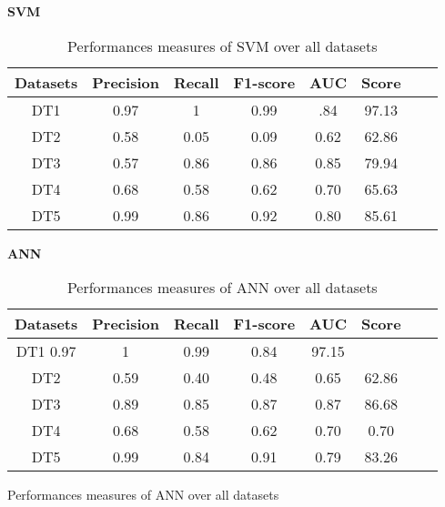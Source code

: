 \documentclass[10pt,a4paper]{article}
\begin{document}
\begin{center}
\textbf{SVM}

\end{center}
\begin{table}[!ht]
\centering
\begin{tabular}{*{6}{c}l r}
  \toprule
  \textbf{Datasets} & \textbf{Precision} & \textbf{Recall} & \textbf{F1-score}&\textbf{AUC} &\textbf{Score}\\
   \midrule
  DT1 &0.97 &1   &0.99 &.84 &97.13 \\
  DT2 &0.58  &0.05   & 0.09&0.62&62.86\\
  DT3 &0.57 & 0.86&0.86&0.85&79.94\\
  DT4 & 0.68&0.58&0.62&0.70&65.63\\
  DT5 &0.99 &0.86&0.92&0.80&85.61\\
    \bottomrule
\end{tabular}
\caption{Performances measures of SVM over all datasets}\label{perf-measure-dt1}
\end{table}
\begin{center}
\textbf{ANN}
\end{center}
\begin{table}[!ht]
\centering
\begin{tabular}{*{6}{c}l r}
  \toprule
  \textbf{Datasets} & \textbf{Precision} & \textbf{Recall} & \textbf{F1-score}&\textbf{AUC} &\textbf{Score}\\
   \midrule
  DT1 0.97&1 &0.99   &0.84 &97.15  \\
  DT2 &0.59  &0.40   &0.48&0.65&62.86 \\
  DT3 &0.89 &0.85 &0.87&0.87&86.68\\
  DT4 &0.68 &0.58&0.62&0.70&0.70\\
  DT5 &0.99 &0.84&0.91&0.79&83.26\\ 
    \bottomrule
\end{tabular}
\caption{Performances measures of ANN over all datasets}\label{perf-measure-dt1}
\end{table}
\begin{table}
\caption{Performances measures of ANN over all datasets}\label{perf-measure-dt1}
\end{table}
\end{document}
